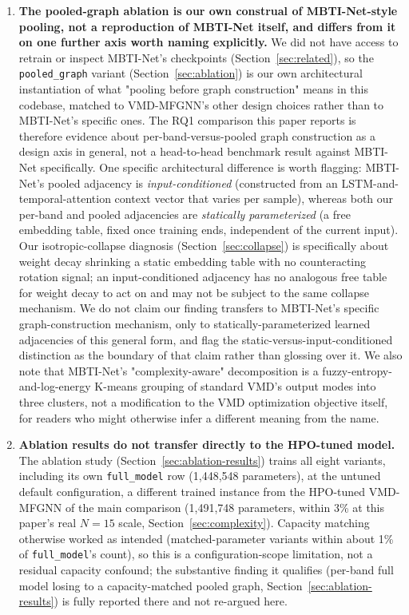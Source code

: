 \documentclass[journal]{IEEEtran}
\begin{document}
\begin{enumerate}
    \item \textbf{The pooled-graph ablation is our own construal of MBTI-Net-style pooling, not a reproduction of MBTI-Net itself, and differs from it on one further axis worth naming explicitly.} We did not have access to retrain or inspect MBTI-Net's checkpoints (Section~\ref{sec:related}), so the \texttt{pooled\_graph} variant (Section~\ref{sec:ablation}) is our own architectural instantiation of what "pooling before graph construction" means in this codebase, matched to VMD-MFGNN's other design choices rather than to MBTI-Net's specific ones. The RQ1 comparison this paper reports is therefore evidence about per-band-versus-pooled graph construction as a design axis in general, not a head-to-head benchmark result against MBTI-Net specifically. One specific architectural difference is worth flagging: MBTI-Net's pooled adjacency is \emph{input-conditioned} (constructed from an LSTM-and-temporal-attention context vector that varies per sample), whereas both our per-band and pooled adjacencies are \emph{statically parameterized} (a free embedding table, fixed once training ends, independent of the current input). Our isotropic-collapse diagnosis (Section~\ref{sec:collapse}) is specifically about weight decay shrinking a static embedding table with no counteracting rotation signal; an input-conditioned adjacency has no analogous free table for weight decay to act on and may not be subject to the same collapse mechanism. We do not claim our finding transfers to MBTI-Net's specific graph-construction mechanism, only to statically-parameterized learned adjacencies of this general form, and flag the static-versus-input-conditioned distinction as the boundary of that claim rather than glossing over it. We also note that MBTI-Net's "complexity-aware" decomposition is a fuzzy-entropy-and-log-energy K-means grouping of standard VMD's output modes into three clusters, not a modification to the VMD optimization objective itself, for readers who might otherwise infer a different meaning from the name.
    \item \textbf{Ablation results do not transfer directly to the HPO-tuned model.} The ablation study (Section~\ref{sec:ablation-results}) trains all eight variants, including its own \texttt{full\_model} row (1{,}448{,}548 parameters), at the untuned default configuration, a different trained instance from the HPO-tuned VMD-MFGNN of the main comparison (1{,}491{,}748 parameters, within 3\% at this paper's real $N=15$ scale, Section~\ref{sec:complexity}). Capacity matching otherwise worked as intended (matched-parameter variants within about 1\% of \texttt{full\_model}'s count), so this is a configuration-scope limitation, not a residual capacity confound; the substantive finding it qualifies (per-band full model losing to a capacity-matched pooled graph, Section~\ref{sec:ablation-results}) is fully reported there and not re-argued here.

\end{enumerate}
\end{document}
